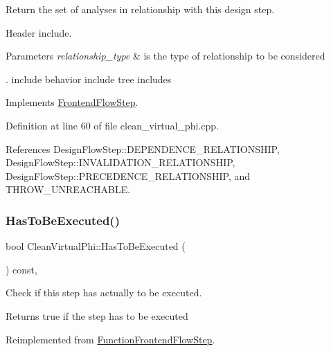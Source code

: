 Return the set of analyses in relationship with this design step. 

Header include.


\begin{DoxyParams}{Parameters}
{\em relationship\+\_\+type} & is the type of relationship to be considered\\
\hline
\end{DoxyParams}
. include behavior include tree includes 

Implements \hyperlink{classFrontendFlowStep_abeaff70b59734e462d347ed343dd700d}{Frontend\+Flow\+Step}.



Definition at line 60 of file clean\+\_\+virtual\+\_\+phi.\+cpp.



References Design\+Flow\+Step\+::\+D\+E\+P\+E\+N\+D\+E\+N\+C\+E\+\_\+\+R\+E\+L\+A\+T\+I\+O\+N\+S\+H\+IP, Design\+Flow\+Step\+::\+I\+N\+V\+A\+L\+I\+D\+A\+T\+I\+O\+N\+\_\+\+R\+E\+L\+A\+T\+I\+O\+N\+S\+H\+IP, Design\+Flow\+Step\+::\+P\+R\+E\+C\+E\+D\+E\+N\+C\+E\+\_\+\+R\+E\+L\+A\+T\+I\+O\+N\+S\+H\+IP, and T\+H\+R\+O\+W\+\_\+\+U\+N\+R\+E\+A\+C\+H\+A\+B\+LE.

\mbox{\label{classCleanVirtualPhi_add0ec70cbdefe63144501ea17de2f5a5}} 
\subsubsection{\texorpdfstring{Has\+To\+Be\+Executed()}{HasToBeExecuted()}}
{\footnotesize\ttfamily bool Clean\+Virtual\+Phi\+::\+Has\+To\+Be\+Executed (\begin{DoxyParamCaption}{ }\end{DoxyParamCaption}) const\hspace{0.3cm}{\ttfamily [override]}, {\ttfamily [virtual]}}



Check if this step has actually to be executed. 

\begin{DoxyReturn}{Returns}
true if the step has to be executed 
\end{DoxyReturn}


Reimplemented from \hyperlink{classFunctionFrontendFlowStep_a12e786363530aa9533e4bd9380130d75}{Function\+Frontend\+Flow\+Step}.



